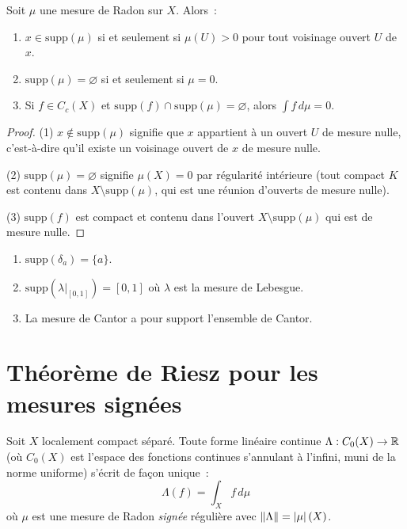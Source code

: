 \begin{proposition}
Soit $\mu$ une mesure de Radon sur $X$. Alors~:
\begin{enumerate}
    \item $x \in \mathrm{supp}(\mu)$ si et seulement si $\mu(U) > 0$ pour tout
    voisinage ouvert $U$ de $x$.
    \item $\mathrm{supp}(\mu) = \varnothing$ si et seulement si $\mu = 0$.
    \item Si $f \in C_c(X)$ et $\mathrm{supp}(f) \cap \mathrm{supp}(\mu) = \varnothing$,
    alors $\int f\, d\mu = 0$.
\end{enumerate}
\end{proposition}

\begin{proof}
(1) $x \notin \mathrm{supp}(\mu)$ signifie que $x$ appartient \`a un ouvert $U$ de
mesure nulle, c'est-\`a-dire qu'il existe un voisinage ouvert de $x$ de mesure nulle.

(2) $\mathrm{supp}(\mu) = \varnothing$ signifie $\mu(X) = 0$ par r\'egularit\'e
int\'erieure (tout compact $K$ est contenu dans $X \setminus \mathrm{supp}(\mu)$,
qui est une r\'eunion d'ouverts de mesure nulle).

(3) $\mathrm{supp}(f)$ est compact et contenu dans l'ouvert
$X \setminus \mathrm{supp}(\mu)$ qui est de mesure nulle.
\end{proof}

\begin{exemple}
\begin{enumerate}
    \item $\mathrm{supp}(\delta_a) = \{a\}$.
    \item $\mathrm{supp}(\lambda|_{[0,1]}) = [0,1]$ o\`u $\lambda$ est la mesure
    de Lebesgue.
    \item La mesure de Cantor a pour support l'ensemble de Cantor.
\end{enumerate}
\end{exemple}

\section{Th\'eor\`eme de Riesz pour les mesures sign\'ees}

\begin{theoreme}
\label{thm:riesz_signe}
Soit $X$ localement compact s\'epar\'e. Toute forme lin\'eaire continue
$\Lambda : C_0(X) \to \mathbb{R}$ (o\`u $C_0(X)$ est l'espace des fonctions continues
s'annulant \`a l'infini, muni de la norme uniforme) s'\'ecrit de fa\c{c}on unique~:
\[
    \Lambda(f) = \int_X f\, d\mu
\]
o\`u $\mu$ est une mesure de Radon \emph{sign\'ee} r\'eguli\`ere avec
$\left\| \Lambda \right\| = \left| \mu \right|(X)$.
\end{theoreme}


